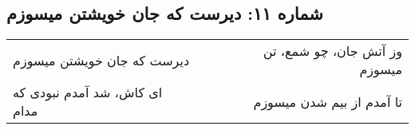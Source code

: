 \begin{center}
\section*{شماره ۱۱: دیرست که جان خویشتن میسوزم}
\label{sec:011}
\begin{longtable}{l p{0.5cm} r}
دیرست که جان خویشتن میسوزم
&&
وز آتش جان، چو شمع، تن میسوزم
\\
ای کاش، شد آمدم نبودی که مدام
&&
تا آمدم از بیم شدن میسوزم
\\
\end{longtable}
\end{center}
